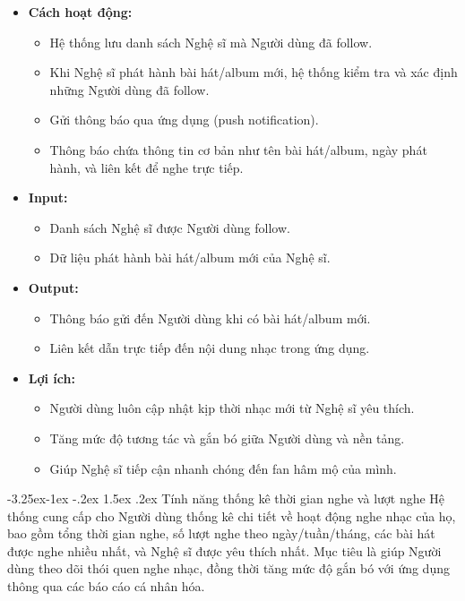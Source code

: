 \documentclass[a4paper]{article}
\makeatletter
\newcommand{\cach}{\hspace*{1.5em}\ignorespaces}
\newcounter {subsubsubsection}[subsubsection]
\newcommand\subsubsubsection{\@startsection{subsubsubsection}{4}{\z@}%
                                     {-3.25ex\@plus -1ex \@minus -.2ex}%
                                     {1.5ex \@plus .2ex}%
                                     {\normalfont\normalsize\bfseries}}
\makeatother
\begin{document}
\begin{itemize}
    \item \textbf{Cách hoạt động:}
    \begin{itemize}
        \item Hệ thống lưu danh sách Nghệ sĩ mà Người dùng đã follow.
        \item Khi Nghệ sĩ phát hành bài hát/album mới, hệ thống kiểm tra và xác định những Người dùng đã follow.
        \item Gửi thông báo qua ứng dụng (push notification).
        \item Thông báo chứa thông tin cơ bản như tên bài hát/album, ngày phát hành, và liên kết để nghe trực tiếp.
    \end{itemize}

    \item \textbf{Input:}
    \begin{itemize}
        \item Danh sách Nghệ sĩ được Người dùng follow.
        \item Dữ liệu phát hành bài hát/album mới của Nghệ sĩ.
    \end{itemize}

    \item \textbf{Output:}
    \begin{itemize}
        \item Thông báo gửi đến Người dùng khi có bài hát/album mới.
        \item Liên kết dẫn trực tiếp đến nội dung nhạc trong ứng dụng.
    \end{itemize}

    \item \textbf{Lợi ích:}
    \begin{itemize}
        \item Người dùng luôn cập nhật kịp thời nhạc mới từ Nghệ sĩ yêu thích.
        \item Tăng mức độ tương tác và gắn bó giữa Người dùng và nền tảng.
        \item Giúp Nghệ sĩ tiếp cận nhanh chóng đến fan hâm mộ của mình.
    \end{itemize}
\end{itemize}
\subsubsubsection{Tính năng thống kê thời gian nghe và lượt nghe}  
\cach Hệ thống cung cấp cho Người dùng thống kê chi tiết về hoạt động nghe nhạc của họ, bao gồm tổng thời gian nghe, số lượt nghe theo ngày/tuần/tháng, các bài hát được nghe nhiều nhất, và Nghệ sĩ được yêu thích nhất.  
Mục tiêu là giúp Người dùng theo dõi thói quen nghe nhạc, đồng thời tăng mức độ gắn bó với ứng dụng thông qua các báo cáo cá nhân hóa.  
\end{document}
